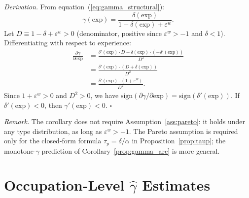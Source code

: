\documentclass[12pt]{article}
\theoremstyle{definition}
\theoremstyle{remark}
\begin{document}
\noindent \textit{Derivation.} From equation~(\ref{eq:gamma_structural}):
\[
\gamma(\text{exp}) = \frac{\delta(\text{exp})}{1 - \delta(\text{exp}) + \varepsilon^w}.
\]
Let $D \equiv 1 - \delta + \varepsilon^w > 0$ (denominator, positive since $\varepsilon^w > -1$
and $\delta < 1$). Differentiating with respect to experience:
\begin{align*}
\frac{\partial \gamma}{\partial \text{exp}}
&= \frac{\delta'(\text{exp}) \cdot D - \delta(\text{exp}) \cdot (-\delta'(\text{exp}))}{D^2} \\
&= \frac{\delta'(\text{exp}) \cdot (D + \delta(\text{exp}))}{D^2} \\
&= \frac{\delta'(\text{exp}) \cdot (1 + \varepsilon^w)}{D^2}.
\end{align*}
Since $1 + \varepsilon^w > 0$ and $D^2 > 0$, we have
$\text{sign}(\partial \gamma / \partial \text{exp}) = \text{sign}(\delta'(\text{exp}))$.
If $\delta'(\text{exp}) < 0$, then $\gamma'(\text{exp}) < 0$. $\square$

\noindent \textit{Remark.} The corollary does not require Assumption~\ref{ass:pareto}: it
holds under any type distribution, as long as $\varepsilon^w > -1$. The Pareto assumption
is required only for the closed-form formula $\tau_p = \delta/\alpha$ in
Proposition~\ref{prop:taup}; the monotone-$\gamma$ prediction of Corollary~\ref{prop:gamma_arc}
is more general.

\newpage
\section{Occupation-Level $\hat{\gamma}$ Estimates}
\label{app:occ_gamma}
\end{document}
